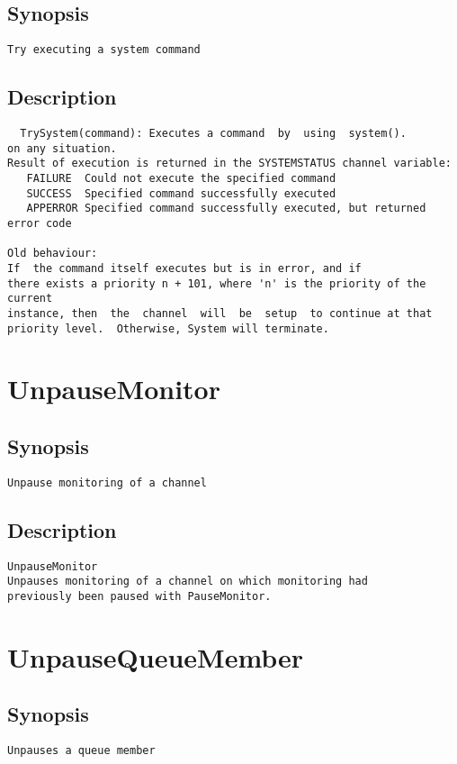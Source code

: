 \subsection{Synopsis}
\begin{verbatim}
Try executing a system command
\end{verbatim}
\subsection{Description}
\begin{verbatim}
  TrySystem(command): Executes a command  by  using  system().
on any situation.
Result of execution is returned in the SYSTEMSTATUS channel variable:
   FAILURE	Could not execute the specified command
   SUCCESS	Specified command successfully executed
   APPERROR	Specified command successfully executed, but returned error code

Old behaviour:
If  the command itself executes but is in error, and if
there exists a priority n + 101, where 'n' is the priority of the current
instance, then  the  channel  will  be  setup  to continue at that
priority level.  Otherwise, System will terminate.

\end{verbatim}


\section{UnpauseMonitor}
\subsection{Synopsis}
\begin{verbatim}
Unpause monitoring of a channel
\end{verbatim}
\subsection{Description}
\begin{verbatim}
UnpauseMonitor
Unpauses monitoring of a channel on which monitoring had
previously been paused with PauseMonitor.

\end{verbatim}


\section{UnpauseQueueMember}
\subsection{Synopsis}
\begin{verbatim}
Unpauses a queue member
\end{verbatim}
